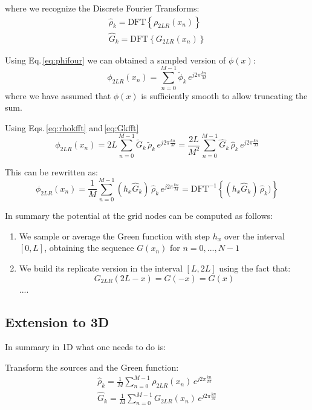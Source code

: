 \documentclass[a4paper,12pt]{report}
\begin{document}
where we recognize the Discrete Fourier Transforms:
\begin{align}
\hat{\rho}_k = \text{DFT}\left\{ \rho_{2LR}(x_n)\right\}\\
\hat{G}_k = \text{DFT}\left\{ G_{2LR}(x_n)\right\}
\end{align}



Using Eq.\,\eqref{eq:phifour} we can obtained a sampled version of $\phi(x)$:
\begin{equation}
\phi_{2LR}(x_n) = 
\sum_{n=0}^{M-1}  
\tilde{\phi}_k\, e^{j2\pi \frac{kn}{M}}
\label{eq:phifft}
\end{equation}
where we have assumed that $\phi(x)$ is sufficiently smooth to allow truncating the sum.


Using Eqs.\,\eqref{eq:rhokfft} and\,\eqref{eq:Gkfft} 
\begin{equation}
\phi_{2LR}(x_n) = 
2L \sum_{n=0}^{M-1}  
\tilde{G}_k \, \tilde{\rho}_k\, e^{j2\pi \frac{kn}{M}} 
= 
\frac{2L}{M^2}
\sum_{n=0}^{M-1}  
\hat{G}_k \, \hat{\rho}_k\, e^{j2\pi \frac{kn}{M}} 
\label{eq:phifftsimpl}
\end{equation}

This can be rewritten as:
\begin{equation}
\phi_{2LR}(x_n) = 
\frac{1}{M}
\sum_{n=0}^{M-1}  
(h_x\hat{G}_k) \, \hat{\rho}_k\, e^{j2\pi \frac{kn}{M}} 
=\text{DFT}^{-1}\left\{
(h_x\hat{G}_k) \, \hat{\rho}_k)
\right\}
\label{eq:invfft}
\end{equation}

In summary the potential at the grid nodes can be computed as follows:
\begin{enumerate}
\item We sample or average the Green function with step $h_x$ over the interval $[0, L]$, obtaining the sequence $G(x_n)$ for $n=0, ..., N-1$
\item We build its replicate version in the interval $[L, 2L]$ using the fact that:
\begin{equation}
G_{2LR}(2L-x) = G(-x) = G(x) 
\end{equation}....
\end{enumerate}


\subsection{Extension to 3D}

In summary in 1D what one needs to do is:

Transform the sources and the Green function:
\begin{align}
\hat{\rho}_k = \frac{1}{M}\sum_{n=0}^{M-1} \rho_{2LR}(x_n)\, e^{j2\pi  \frac{kn}{M}} \\
\hat{G}_k = \frac{1}{M}\sum_{n=0}^{M-1} G_{2LR}(x_n)\, e^{j2\pi  \frac{kn}{M}}  
\end{align}
\end{document}
